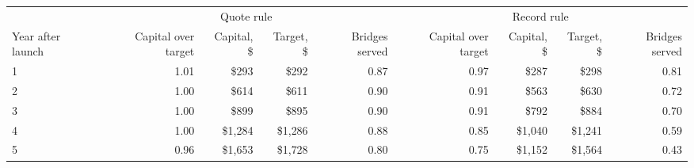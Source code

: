 \begin{tabular}{lrrrrrrrr}
\toprule
 & \multicolumn{4}{c}{Quote rule} & \multicolumn{4}{c}{Record rule} \\
Year after launch & Capital over target & Capital, \$ & Target, \$ & Bridges served & Capital over target & Capital, \$ & Target, \$ & Bridges served \\
\midrule
1 & 1.01 & \$293 & \$292 & 0.87 & 0.97 & \$287 & \$298 & 0.81 \\
2 & 1.00 & \$614 & \$611 & 0.90 & 0.91 & \$563 & \$630 & 0.72 \\
3 & 1.00 & \$899 & \$895 & 0.90 & 0.91 & \$792 & \$884 & 0.70 \\
4 & 1.00 & \$1{,}284 & \$1{,}286 & 0.88 & 0.85 & \$1{,}040 & \$1{,}241 & 0.59 \\
5 & 0.96 & \$1{,}653 & \$1{,}728 & 0.80 & 0.75 & \$1{,}152 & \$1{,}564 & 0.43 \\
\bottomrule
\end{tabular}
